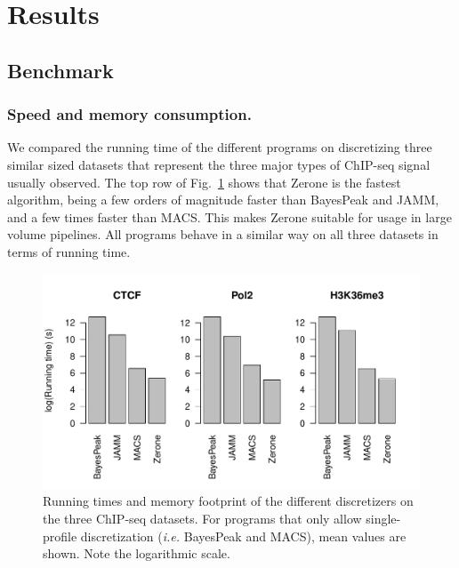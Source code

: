 \documentclass{bioinfo}
\begin{document}
\section{Results}\label{results}


\subsection{Benchmark}
\subsubsection{Speed and memory consumption.}
We compared the running time of the different programs on discretizing three
similar sized datasets that represent the three major types of ChIP-seq signal
usually observed. The top row of Fig.~\ref{fig:times} shows that Zerone is
the fastest algorithm, being a few orders of magnitude faster than BayesPeak
and JAMM, and a few times faster than MACS. This makes Zerone suitable for
usage in large volume pipelines. All programs behave in a similar
way on all three datasets in terms of running time.

\begin{figure}[!tpb]
\centerline{\includegraphics[scale=0.5]{running_times.pdf}}
\caption{Running times and memory footprint of the different discretizers
on the three ChIP-seq datasets.
For programs that only allow single-profile discretization
(\textit{i.e.} BayesPeak and MACS), mean values are shown.
Note the logarithmic scale.
}\label{fig:times}
\end{figure}
\end{document}
